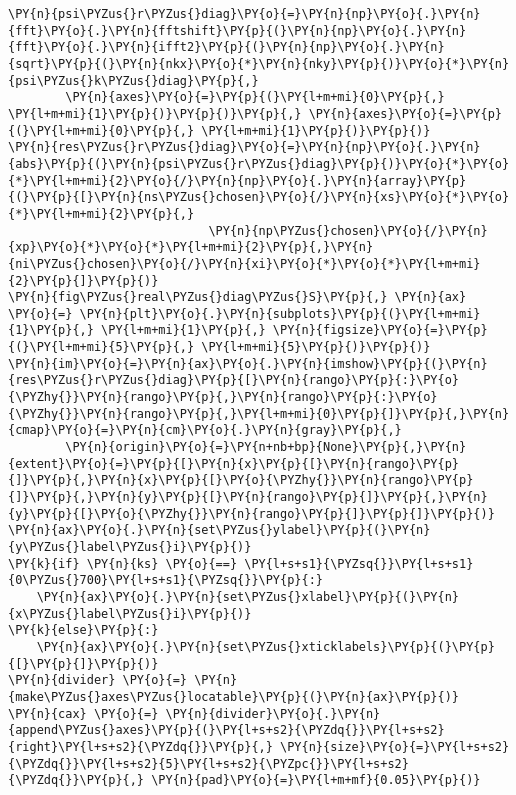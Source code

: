 \begin{Verbatim}[commandchars=\\\{\}]
\PY{n}{psi\PYZus{}r\PYZus{}diag}\PY{o}{=}\PY{n}{np}\PY{o}{.}\PY{n}{fft}\PY{o}{.}\PY{n}{fftshift}\PY{p}{(}\PY{n}{np}\PY{o}{.}\PY{n}{fft}\PY{o}{.}\PY{n}{ifft2}\PY{p}{(}\PY{n}{np}\PY{o}{.}\PY{n}{sqrt}\PY{p}{(}\PY{n}{nkx}\PY{o}{*}\PY{n}{nky}\PY{p}{)}\PY{o}{*}\PY{n}{psi\PYZus{}k\PYZus{}diag}\PY{p}{,}
        \PY{n}{axes}\PY{o}{=}\PY{p}{(}\PY{l+m+mi}{0}\PY{p}{,} \PY{l+m+mi}{1}\PY{p}{)}\PY{p}{)}\PY{p}{,} \PY{n}{axes}\PY{o}{=}\PY{p}{(}\PY{l+m+mi}{0}\PY{p}{,} \PY{l+m+mi}{1}\PY{p}{)}\PY{p}{)}
\PY{n}{res\PYZus{}r\PYZus{}diag}\PY{o}{=}\PY{n}{np}\PY{o}{.}\PY{n}{abs}\PY{p}{(}\PY{n}{psi\PYZus{}r\PYZus{}diag}\PY{p}{)}\PY{o}{*}\PY{o}{*}\PY{l+m+mi}{2}\PY{o}{/}\PY{n}{np}\PY{o}{.}\PY{n}{array}\PY{p}{(}\PY{p}{[}\PY{n}{ns\PYZus{}chosen}\PY{o}{/}\PY{n}{xs}\PY{o}{*}\PY{o}{*}\PY{l+m+mi}{2}\PY{p}{,}
                            \PY{n}{np\PYZus{}chosen}\PY{o}{/}\PY{n}{xp}\PY{o}{*}\PY{o}{*}\PY{l+m+mi}{2}\PY{p}{,}\PY{n}{ni\PYZus{}chosen}\PY{o}{/}\PY{n}{xi}\PY{o}{*}\PY{o}{*}\PY{l+m+mi}{2}\PY{p}{]}\PY{p}{)}
\PY{n}{fig\PYZus{}real\PYZus{}diag\PYZus{}S}\PY{p}{,} \PY{n}{ax} \PY{o}{=} \PY{n}{plt}\PY{o}{.}\PY{n}{subplots}\PY{p}{(}\PY{l+m+mi}{1}\PY{p}{,} \PY{l+m+mi}{1}\PY{p}{,} \PY{n}{figsize}\PY{o}{=}\PY{p}{(}\PY{l+m+mi}{5}\PY{p}{,} \PY{l+m+mi}{5}\PY{p}{)}\PY{p}{)}
\PY{n}{im}\PY{o}{=}\PY{n}{ax}\PY{o}{.}\PY{n}{imshow}\PY{p}{(}\PY{n}{res\PYZus{}r\PYZus{}diag}\PY{p}{[}\PY{n}{rango}\PY{p}{:}\PY{o}{\PYZhy{}}\PY{n}{rango}\PY{p}{,}\PY{n}{rango}\PY{p}{:}\PY{o}{\PYZhy{}}\PY{n}{rango}\PY{p}{,}\PY{l+m+mi}{0}\PY{p}{]}\PY{p}{,}\PY{n}{cmap}\PY{o}{=}\PY{n}{cm}\PY{o}{.}\PY{n}{gray}\PY{p}{,}
        \PY{n}{origin}\PY{o}{=}\PY{n+nb+bp}{None}\PY{p}{,}\PY{n}{extent}\PY{o}{=}\PY{p}{[}\PY{n}{x}\PY{p}{[}\PY{n}{rango}\PY{p}{]}\PY{p}{,}\PY{n}{x}\PY{p}{[}\PY{o}{\PYZhy{}}\PY{n}{rango}\PY{p}{]}\PY{p}{,}\PY{n}{y}\PY{p}{[}\PY{n}{rango}\PY{p}{]}\PY{p}{,}\PY{n}{y}\PY{p}{[}\PY{o}{\PYZhy{}}\PY{n}{rango}\PY{p}{]}\PY{p}{]}\PY{p}{)}
\PY{n}{ax}\PY{o}{.}\PY{n}{set\PYZus{}ylabel}\PY{p}{(}\PY{n}{y\PYZus{}label\PYZus{}i}\PY{p}{)}
\PY{k}{if} \PY{n}{ks} \PY{o}{==} \PY{l+s+s1}{\PYZsq{}}\PY{l+s+s1}{0\PYZus{}700}\PY{l+s+s1}{\PYZsq{}}\PY{p}{:}
    \PY{n}{ax}\PY{o}{.}\PY{n}{set\PYZus{}xlabel}\PY{p}{(}\PY{n}{x\PYZus{}label\PYZus{}i}\PY{p}{)}
\PY{k}{else}\PY{p}{:}
    \PY{n}{ax}\PY{o}{.}\PY{n}{set\PYZus{}xticklabels}\PY{p}{(}\PY{p}{[}\PY{p}{]}\PY{p}{)}
\PY{n}{divider} \PY{o}{=} \PY{n}{make\PYZus{}axes\PYZus{}locatable}\PY{p}{(}\PY{n}{ax}\PY{p}{)}
\PY{n}{cax} \PY{o}{=} \PY{n}{divider}\PY{o}{.}\PY{n}{append\PYZus{}axes}\PY{p}{(}\PY{l+s+s2}{\PYZdq{}}\PY{l+s+s2}{right}\PY{l+s+s2}{\PYZdq{}}\PY{p}{,} \PY{n}{size}\PY{o}{=}\PY{l+s+s2}{\PYZdq{}}\PY{l+s+s2}{5}\PY{l+s+s2}{\PYZpc{}}\PY{l+s+s2}{\PYZdq{}}\PY{p}{,} \PY{n}{pad}\PY{o}{=}\PY{l+m+mf}{0.05}\PY{p}{)}

\end{Verbatim}
